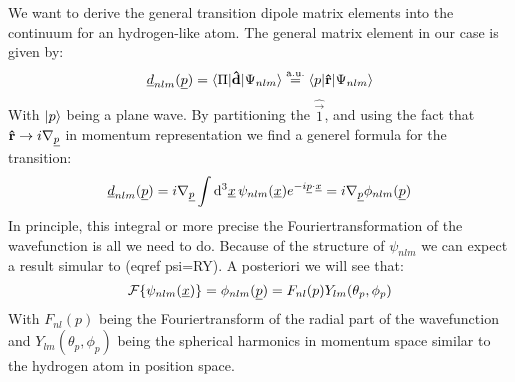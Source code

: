 \label{sec:dipolematrixelements}
We want to derive the general transition dipole matrix elements into the continuum for an hydrogen-like atom. The general matrix element in our case is given by:
\begin{equation*}
    \underline{d}_{nlm}(\underline{p}) = \braket{\Pi|\mathbf{\hat{d}}|\Psi_{nlm}} \stackrel{\mathrm{a.u.}}{=} \braket{p|\mathbf{\hat{r}}|\Psi_{nlm}}
\end{equation*}
With $\ket{p}$ being a plane wave. By partitioning the $\hat{\vec{1}}$, and using the fact that $\mathbf{\hat{r}} \rightarrow i\nabla_{\underline{p}}$ %
in momentum representation we find a generel formula for the transition:
\begin{equation*}
    \underline{d}_{nlm}(\underline{p}) = i\nabla_{\underline{p}}\int \mathrm{d}^3\underline{x}\,\psi_{nlm}(\underline{x}) e^{-i\underline{p}\cdot\underline{x}} = i\nabla_{\underline{p}}\phi_{nlm}(\underline{p})
\end{equation*}
In principle, this integral or more precise the Fouriertransformation of the wavefunction is all we need to do.
Because of the structure of $\psi_{nlm}$ we can expect a result simular to (eqref psi=RY).
A posteriori we will see that:
\begin{equation*}
    \mathcal{F}\{\psi_{nlm}(\underline{x})\} = \phi_{nlm}(\underline{p}) = F_{nl}(p)Y_{lm}(\theta_p, \phi_p)
\end{equation*}
With $F_{nl}(p)$ being the Fouriertransform of the radial part of the wavefunction and $Y_{lm}(\theta_p, \phi_p)$ being the spherical harmonics in momentum space similar to the hydrogen atom in position space.




